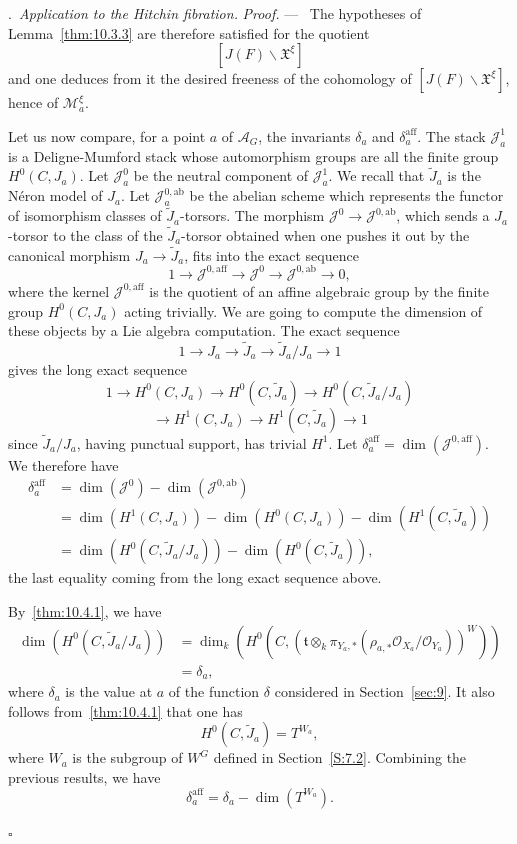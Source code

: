 \documentclass[12pt,a4paper,oneside,english,leqno]{smfart}
\makeatletter
\numberwithin{equation}{subsection}
\numberwithin{theo}{subsection}
\newenvironment{paragr}[1][]{\medskip\refstepcounter{subsection}%
  \par\noindent\hspace*{\parindent}\thesubsection.\ \emph{#1}%
  \@ifundefined{@empty}{}{}\ignorespaces}{\medskip}
\theoremstyle{plain}
\theoremstyle{definition}
\theoremstyle{remark}
\newenvironment{preuve}[1][]{\medskip\noindent\textit{Proof.} #1 ---\ }%
  {\hfill\ensuremath{\square}\medskip}
\newcommand{\oc}{\mathcal{O}}
\newcommand{\mc}{\mathcal{M}}
\newcommand{\Ac}{\mathcal{A}}
\newcommand{\Jc}{\mathcal{J}}
\newcommand{\tgo}{\mathfrak{t}}
\newcommand{\Xgo}{\mathfrak{X}}
\newcommand{\back}{\backslash}
\makeatother
\begin{document}
\begin{paragr}[Application to the Hitchin fibration.]
\begin{preuve}
The hypotheses of Lemma~\ref{thm:10.3.3} are therefore satisfied for the quotient
$$[J(F)\back\Xgo^\xi]$$
and one deduces from it the desired freeness of the cohomology of $[J(F)\back\Xgo^\xi]$, hence of $\mc_a^\xi$.

Let us now compare, for a point $a$ of $\Ac_G$, the invariants $\delta_a$ and $\delta_a^{\mathrm{aff}}$. The stack $\Jc_a^1$ is a Deligne-Mumford stack whose automorphism groups are all the finite group $H^0(C,J_a)$. Let $\Jc_a^0$ be the neutral component of $\Jc_a^1$. We recall that $\tilde{J}_a$ is the Néron model of $J_a$. Let $\Jc_a^{0,\mathrm{ab}}$ be the abelian scheme which represents the functor of isomorphism classes of $\tilde{J}_a$-torsors. The morphism $\Jc^0\longrightarrow\Jc^{0,\mathrm{ab}}$, which sends a $J_a$-torsor to the class of the $\tilde{J}_a$-torsor obtained when one pushes it out by the canonical morphism $J_a\to\tilde{J}_a$, fits into the exact sequence
$$1\longrightarrow\Jc^{0,\mathrm{aff}}\longrightarrow\Jc^0\longrightarrow\Jc^{0,\mathrm{ab}}\longrightarrow 0,$$
where the kernel $\Jc^{0,\mathrm{aff}}$ is the quotient of an affine algebraic group by the finite group $H^0(C,J_a)$ acting trivially. We are going to compute the dimension of these objects by a Lie algebra computation. The exact sequence
$$1\longrightarrow J_a\longrightarrow\tilde{J}_a\longrightarrow\tilde{J}_a/J_a\longrightarrow 1$$
gives the long exact sequence
$$1\longrightarrow H^0(C,J_a)\longrightarrow H^0(C,\tilde{J}_a)\longrightarrow H^0(C,\tilde{J}_a/J_a)$$
$$\longrightarrow H^1(C,J_a)\longrightarrow H^1(C,\tilde{J}_a)\longrightarrow 1$$
since $\tilde{J}_a/J_a$, having punctual support, has trivial $H^1$. Let $\delta_a^{\mathrm{aff}} = \dim(\Jc^{0,\mathrm{aff}})$. We therefore have
\begin{align*}
\delta_a^{\mathrm{aff}} &= \dim(\Jc^0)-\dim(\Jc^{0,\mathrm{ab}})\\
&= \dim(H^1(C,J_a))-\dim(H^0(C,J_a))-\dim(H^1(C,\tilde{J}_a))\\
&= \dim(H^0(C,\tilde{J}_a/J_a))-\dim(H^0(C,\tilde{J}_a)),
\end{align*}
the last equality coming from the long exact sequence above.

By~\ref{thm:10.4.1}, we have
\begin{align*}
\dim(H^0(C,\tilde{J}_a/J_a)) &= \dim_k(H^0(C,(\tgo\otimes_k\pi_{Y_a,*}(\rho_{a,*}\oc_{X_a}/\oc_{Y_a}))^W))\\
&= \delta_a,
\end{align*}
where $\delta_a$ is the value at $a$ of the function $\delta$ considered in Section~\ref{sec:9}. It also follows from~\ref{thm:10.4.1} that one has
$$H^0(C,\tilde{J}_a) = T^{W_a},$$
where $W_a$ is the subgroup of $W^G$ defined in Section~\ref{S:7.2}. Combining the previous results, we have
$$\delta_a^{\mathrm{aff}} = \delta_a-\dim(T^{W_a}).$$


\end{preuve}
\end{paragr}
\end{document}
